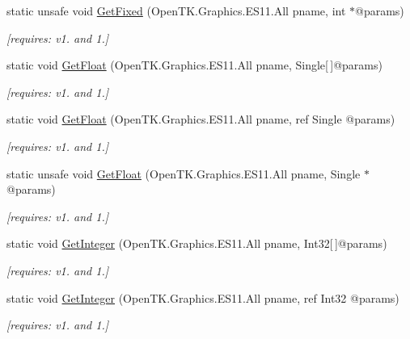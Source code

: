 \begin{DoxyCompactItemize}
static unsafe void \hyperlink{class_open_t_k_1_1_graphics_1_1_e_s11_1_1_g_l_a0cf07a3f0bf04188dfea59fb8915ea51}{Get\-Fixed} (Open\-T\-K.\-Graphics.\-E\-S11.\-All pname, int $\ast$@params)
\begin{DoxyCompactList}\small\item\em \mbox{[}requires\-: v1. and 1.\mbox{]}\end{DoxyCompactList}\item 
static void \hyperlink{class_open_t_k_1_1_graphics_1_1_e_s11_1_1_g_l_a462a9b2e35181c6ffa3ebb319692e907}{Get\-Float} (Open\-T\-K.\-Graphics.\-E\-S11.\-All pname, Single\mbox{[}$\,$\mbox{]}@params)
\begin{DoxyCompactList}\small\item\em \mbox{[}requires\-: v1. and 1.\mbox{]}\end{DoxyCompactList}\item 
static void \hyperlink{class_open_t_k_1_1_graphics_1_1_e_s11_1_1_g_l_ae67e48f42910d45600fa8d6da368292e}{Get\-Float} (Open\-T\-K.\-Graphics.\-E\-S11.\-All pname, ref Single @params)
\begin{DoxyCompactList}\small\item\em \mbox{[}requires\-: v1. and 1.\mbox{]}\end{DoxyCompactList}\item 
static unsafe void \hyperlink{class_open_t_k_1_1_graphics_1_1_e_s11_1_1_g_l_a7ad8eb8df710fb2e0638b990c3f47a6e}{Get\-Float} (Open\-T\-K.\-Graphics.\-E\-S11.\-All pname, Single $\ast$@params)
\begin{DoxyCompactList}\small\item\em \mbox{[}requires\-: v1. and 1.\mbox{]}\end{DoxyCompactList}\item 
static void \hyperlink{class_open_t_k_1_1_graphics_1_1_e_s11_1_1_g_l_a4b975623b583ab7bbb900d653a975bae}{Get\-Integer} (Open\-T\-K.\-Graphics.\-E\-S11.\-All pname, Int32\mbox{[}$\,$\mbox{]}@params)
\begin{DoxyCompactList}\small\item\em \mbox{[}requires\-: v1. and 1.\mbox{]}\end{DoxyCompactList}\item 
static void \hyperlink{class_open_t_k_1_1_graphics_1_1_e_s11_1_1_g_l_afba611b6d93a1fa82b820de0389a4abe}{Get\-Integer} (Open\-T\-K.\-Graphics.\-E\-S11.\-All pname, ref Int32 @params)
\begin{DoxyCompactList}\small\item\em \mbox{[}requires\-: v1. and 1.\mbox{]}\end{DoxyCompactList}\item 

\end{DoxyCompactItemize}
